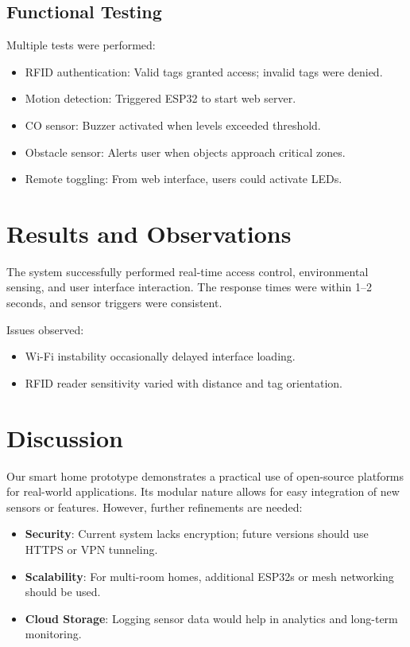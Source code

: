 \documentclass[conference, onecolumn]{IEEEtran}
\begin{document}
\subsection{Functional Testing}
Multiple tests were performed:
\begin{itemize}
    \item RFID authentication: Valid tags granted access; invalid tags were denied.
    \item Motion detection: Triggered ESP32 to start web server.
    \item CO sensor: Buzzer activated when levels exceeded threshold.
    \item Obstacle sensor: Alerts user when objects approach critical zones.
    \item Remote toggling: From web interface, users could activate LEDs.
\end{itemize}

\section{Results and Observations}
The system successfully performed real-time access control, environmental sensing, and user interface interaction. The response times were within 1–2 seconds, and sensor triggers were consistent.

Issues observed:
\begin{itemize}
    \item Wi-Fi instability occasionally delayed interface loading.
    \item RFID reader sensitivity varied with distance and tag orientation.
\end{itemize}

\section{Discussion}
Our smart home prototype demonstrates a practical use of open-source platforms for real-world applications. Its modular nature allows for easy integration of new sensors or features. However, further refinements are needed:
\begin{itemize}
    \item \textbf{Security}: Current system lacks encryption; future versions should use HTTPS or VPN tunneling.
    \item \textbf{Scalability}: For multi-room homes, additional ESP32s or mesh networking should be used.
    \item \textbf{Cloud Storage}: Logging sensor data would help in analytics and long-term monitoring.
\end{itemize}
\end{document}
